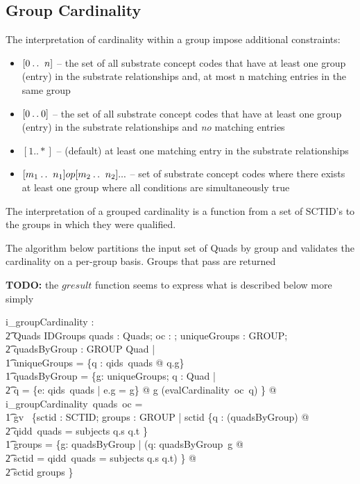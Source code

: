 \documentclass{article}
\begin{document}
\subsection{Group Cardinality}
The interpretation of cardinality within a group impose additional constraints:
\begin{itemize}[noitemsep,nolistsep]
\item{$[0\mathbin{\ldotp\ldotp}~n]$} -- the set of all substrate concept codes that have at least one group (entry) in the substrate relationships and,
at most n matching entries in the same group
\item{$[0\mathbin{\ldotp\ldotp}0]$} -- the set of all substrate concept codes that have at least one group (entry) in the substrate relationships and \emph{no} matching entries 
\item{$[1..*]$} -- (default) at least one matching entry in the substrate relationships
\item{$[m_1\mathbin{\ldotp\ldotp}~n_1] op [m_2\mathbin{\ldotp\ldotp}~n_2] ... $} -- set of substrate concept codes where there exists at least one group where all conditions are simultaneously true
\end{itemize}

The interpretation of a grouped cardinality is a function from a set of SCTID's to the groups in which they were qualified.

The algorithm below partitions the input set of Quads by group and validates the cardinality on a per-group basis.  Groups that
pass are returned

\textbf{TODO:} the $gresult$ function seems to express what is described below more simply
\begin{gendef}
   i\_groupCardinality : \\
\t2 Quads \fun \optional[cardinality] \fun IDGroups
\where
   \forall quads : Quads; oc : \optional[cardinality]; uniqueGroups : \power GROUP; \\
\t2 quadsByGroup : GROUP \pfun \power Quad |  \\
\t1    uniqueGroups = \{q : qids~quads @ q.g\}  \land \\
\t1    quadsByGroup = \{g: uniqueGroups; q : \power Quad | \\
\t2 q = \{e: qids~quads | e.g = g\}  @ g \mapsto (evalCardinality~oc~q) \} @ \\
i\_groupCardinality~quads~oc = \\
\t1 gv~ \{sctid : SCTID; groups : \power GROUP | sctid \in \{q : \bigcup (\ran quadsByGroup) @ \\
\t2  \IF qidd~quads = subjects \THEN q.s \ELSE q.t \} \land \\
\t1 groups = \{g: \dom quadsByGroup | (\exists q: quadsByGroup~g @ \\
\t2 sctid = \IF qidd~quads = subjects \THEN q.s \ELSE q.t) \} @ \\
\t2 sctid \mapsto groups \}
\end{gendef}
\end{document}
